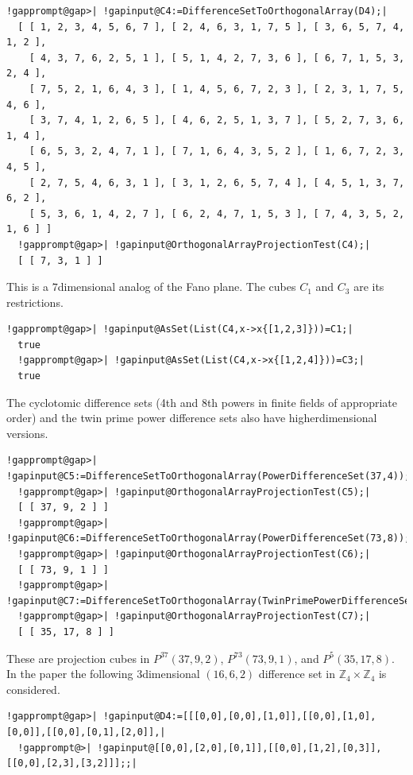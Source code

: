 \documentclass[a4paper,11pt]{report}
\begin{document}
{{\begin{Verbatim}[commandchars=!@|,fontsize=\small,frame=single,label=Example]
  !gapprompt@gap>| !gapinput@C4:=DifferenceSetToOrthogonalArray(D4);|
  [ [ 1, 2, 3, 4, 5, 6, 7 ], [ 2, 4, 6, 3, 1, 7, 5 ], [ 3, 6, 5, 7, 4, 1, 2 ], 
    [ 4, 3, 7, 6, 2, 5, 1 ], [ 5, 1, 4, 2, 7, 3, 6 ], [ 6, 7, 1, 5, 3, 2, 4 ], 
    [ 7, 5, 2, 1, 6, 4, 3 ], [ 1, 4, 5, 6, 7, 2, 3 ], [ 2, 3, 1, 7, 5, 4, 6 ], 
    [ 3, 7, 4, 1, 2, 6, 5 ], [ 4, 6, 2, 5, 1, 3, 7 ], [ 5, 2, 7, 3, 6, 1, 4 ], 
    [ 6, 5, 3, 2, 4, 7, 1 ], [ 7, 1, 6, 4, 3, 5, 2 ], [ 1, 6, 7, 2, 3, 4, 5 ], 
    [ 2, 7, 5, 4, 6, 3, 1 ], [ 3, 1, 2, 6, 5, 7, 4 ], [ 4, 5, 1, 3, 7, 6, 2 ], 
    [ 5, 3, 6, 1, 4, 2, 7 ], [ 6, 2, 4, 7, 1, 5, 3 ], [ 7, 4, 3, 5, 2, 1, 6 ] ]
  !gapprompt@gap>| !gapinput@OrthogonalArrayProjectionTest(C4);|
  [ [ 7, 3, 1 ] ]
\end{Verbatim}
 This is a $7$\texttt{}dimensional analog of the Fano plane. The cubes $C_1$ and $C_3$ are its restrictions. 
\begin{Verbatim}[commandchars=!@|,fontsize=\small,frame=single,label=Example]
  !gapprompt@gap>| !gapinput@AsSet(List(C4,x->x{[1,2,3]}))=C1;|
  true
  !gapprompt@gap>| !gapinput@AsSet(List(C4,x->x{[1,2,4]}))=C3;|
  true
\end{Verbatim}
 The cyclotomic difference sets (4th and 8th powers in finite fields of
appropriate order) and the twin prime power difference sets also have
higher\texttt{}dimensional versions. 
\begin{Verbatim}[commandchars=!@|,fontsize=\small,frame=single,label=Example]
  !gapprompt@gap>| !gapinput@C5:=DifferenceSetToOrthogonalArray(PowerDifferenceSet(37,4));;|
  !gapprompt@gap>| !gapinput@OrthogonalArrayProjectionTest(C5);|
  [ [ 37, 9, 2 ] ]
  !gapprompt@gap>| !gapinput@C6:=DifferenceSetToOrthogonalArray(PowerDifferenceSet(73,8));;|
  !gapprompt@gap>| !gapinput@OrthogonalArrayProjectionTest(C6);|
  [ [ 73, 9, 1 ] ]
  !gapprompt@gap>| !gapinput@C7:=DifferenceSetToOrthogonalArray(TwinPrimePowerDifferenceSet(5));;|
  !gapprompt@gap>| !gapinput@OrthogonalArrayProjectionTest(C7);|
  [ [ 35, 17, 8 ] ]
\end{Verbatim}
 These are projection cubes in $P^{37}(37,9,2)$, $P^{73}(73,9,1)$, and $P^5(35,17,8)$. In the paper \cite{KR24} the following $3$\texttt{}dimensional $(16,6,2)$ difference set in $\mathbb{Z}_4\times \mathbb{Z}_4$ is considered. 
\begin{Verbatim}[commandchars=!@|,fontsize=\small,frame=single,label=Example]
  !gapprompt@gap>| !gapinput@D4:=[[[0,0],[0,0],[1,0]],[[0,0],[1,0],[0,0]],[[0,0],[0,1],[2,0]],|
  !gapprompt@>| !gapinput@[[0,0],[2,0],[0,1]],[[0,0],[1,2],[0,3]],[[0,0],[2,3],[3,2]]];;|

\end{Verbatim}}}
\end{document}
